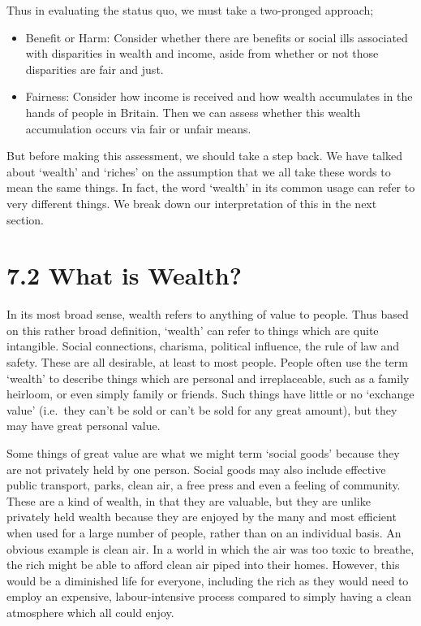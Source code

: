 \documentclass[]{tufte-handout}
\providecommand{\tightlist}{%
  \setlength{\itemsep}{0pt}\setlength{\parskip}{0pt}}
\begin{document}
Thus in evaluating the status quo, we must take a two-pronged approach;

\begin{itemize}
\tightlist
\item
  Benefit or Harm: Consider whether there are benefits or social ills
  associated with disparities in wealth and income, aside from whether
  or not those disparities are fair and just.
\item
  Fairness: Consider how income is received and how wealth accumulates
  in the hands of people in Britain. Then we can assess whether this
  wealth accumulation occurs via fair or unfair means.
\end{itemize}

But before making this assessment, we should take a step back. We have
talked about `wealth' and `riches' on the assumption that we all take
these words to mean the same things. In fact, the word `wealth' in its
common usage can refer to very different things. We break down our
interpretation of this in the next section.

\hypertarget{what-is-wealth}{%
\section{7.2 What is Wealth?}\label{what-is-wealth}}

In its most broad sense, wealth refers to anything of value to people.
Thus based on this rather broad definition, `wealth' can refer to things
which are quite intangible. Social connections, charisma, political
influence, the rule of law and safety. These are all desirable, at least
to most people. People often use the term `wealth' to describe things
which are personal and irreplaceable, such as a family heirloom, or even
simply family or friends. Such things have little or no `exchange value'
(i.e.~they can't be sold or can't be sold for any great amount), but
they may have great personal value.

Some things of great value are what we might term `social goods' because
they are not privately held by one person. Social goods may also include
effective public transport, parks, clean air, a free press and even a
feeling of community. These are a kind of wealth, in that they are
valuable, but they are unlike privately held wealth because they are
enjoyed by the many and most efficient when used for a large number of
people, rather than on an individual basis. An obvious example is clean
air. In a world in which the air was too toxic to breathe, the rich
might be able to afford clean air piped into their homes. However, this
would be a diminished life for everyone, including the rich as they
would need to employ an expensive, labour-intensive process compared to
simply having a clean atmosphere which all could enjoy.
\end{document}
